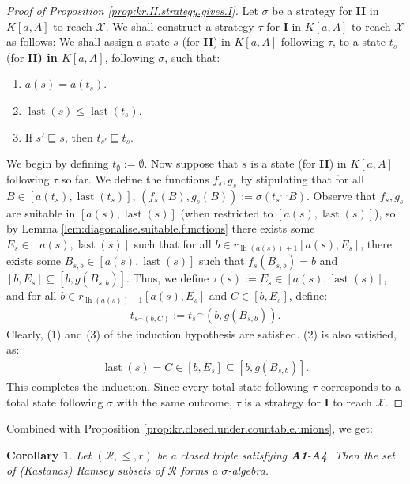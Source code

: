 \documentclass[11pt,reqno]{amsart}
\theoremstyle{plain}
\numberwithin{equation}{section}
\newtheorem{corollary}[theorem]{Corollary}
\theoremstyle{definition}
\newcommand{\func}{\operatorname}
\newcommand{\cal}{\mathcal}
\newcommand{\X}{\cal{X}}
\newcommand{\lh}{\func{lh}}
\newcommand{\last}{\func{last}}
\begin{document}
\begin{proof}[Proof of Proposition \ref{prop:kr.II.strategy.gives.I}]
    Let $\sigma$ be a strategy for \textbf{II} in $K[a,A]$ to reach $\X$. We shall construct a strategy $\tau$ for \textbf{I} in $K[a,A]$ to reach $\X$ as follows: We shall assign a state $s$ (for \textbf{II}) in $K[a,A]$ following $\tau$, to a state $t_s$ (for \textbf{II) in $K[a,A]$}, following $\sigma$, such that:
    \begin{enumerate}
        \item $a(s) = a(t_s)$.

        \item $\last(s) \leq \last(t_s)$. 

        \item If $s' \sqsubseteq s$, then $t_{s'} \sqsubseteq t_s$.
    \end{enumerate}
    We begin by defining $t_\emptyset := \emptyset$. Now suppose that $s$ is a state (for \textbf{II}) in $K[a,A]$ following $\tau$ so far. We define the functions $f_s,g_s$ by stipulating that for all $B \in [a(t_s),\last(t_s)]$, $(f_s(B),g_s(B)) := \sigma({t_s}^\frown B)$. Observe that $f_s,g_s$ are suitable in $[a(s),\last(s)]$ (when restricted to $[a(s),\last(s)]$), so by Lemma \ref{lem:diagonalise.suitable.functions} there exists some $E_s \in [a(s),\last(s)]$ such that for all $b \in r_{\lh(a(s))+1}[a(s),E_s]$, there exists some $B_{s,b} \in [a(s),\last(s)]$ such that $f_s(B_{s,b}) = b$ and $[b,E_s] \subseteq [b,g(B_{s,b})]$. Thus, we define $\tau(s) := E_s \in [a(s),\last(s)]$, and for all $b \in r_{\lh(a(s))+1}[a(s),E_s]$ and $C \in [b,E_s]$, define:
    \begin{align*}
        t_{s^\frown(b,C)} := {t_s}^\frown(b,g(B_{s,b})).
    \end{align*}
    Clearly, (1) and (3) of the induction hypothesis are satisfied. (2) is also satisfied, as:
    \begin{align*}
        \last(s) = C \in [b,E_s] \subseteq [b,g(B_{s,b})].
    \end{align*}
    This completes the induction. Since every total state following $\tau$ corresponds to a total state following $\sigma$ with the same outcome, $\tau$ is a strategy for \textbf{I} to reach $\X$.
\end{proof}

Combined with Proposition \ref{prop:kr.closed.under.countable.unions}, we get:

\begin{corollary}
\label{cor:measurable.is.ramsey}
    Let $(\cal{R},\leq,r)$ be a closed triple satisfying \textbf{A1}-\textbf{A4}. Then the set of (Kastanas) Ramsey subsets of $\cal{R}$ forms a $\sigma$-algebra.
\end{corollary}
\end{document}
